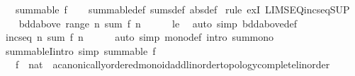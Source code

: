 \begin{isabellebody}
\ \ \ {\isachardoublequoteopen}summable\ f{\isachardoublequoteclose}\isanewline
%
\isadelimproof
\ \ %
\endisadelimproof
%
\isatagproof
{}\isamarkupfalse%
\ summable{\isacharunderscore}{\kern0pt}def\ sums{\isacharunderscore}{\kern0pt}def\ {\isacharbrackleft}{\kern0pt}abs{\isacharunderscore}{\kern0pt}def{\isacharbrackright}{\kern0pt}\isanewline
{}\isamarkupfalse%
\ {\isacharparenleft}{\kern0pt}rule\ exI\ LIMSEQ{\isacharunderscore}{\kern0pt}incseq{\isacharunderscore}{\kern0pt}SUP{\isacharparenright}{\kern0pt}{\isacharplus}{\kern0pt}\isanewline
\ \ \isamarkupfalse%
\ {\isachardoublequoteopen}bdd{\isacharunderscore}{\kern0pt}above\ {\isacharparenleft}{\kern0pt}range\ {\isacharparenleft}{\kern0pt}{\isasymlambda}n{\isachardot}{\kern0pt}\ sum\ f\ {\isacharbraceleft}{\kern0pt}{\isachardot}{\kern0pt}{\isachardot}{\kern0pt}{\isacharless}{\kern0pt}n{\isacharbraceright}{\kern0pt}{\isacharparenright}{\kern0pt}{\isacharparenright}{\kern0pt}{\isachardoublequoteclose}\isanewline
\ \ \ \ \isamarkupfalse%
\ le\ \isamarkupfalse%
\ {\isacharparenleft}{\kern0pt}auto\ simp{\isacharcolon}{\kern0pt}\ bdd{\isacharunderscore}{\kern0pt}above{\isacharunderscore}{\kern0pt}def{\isacharparenright}{\kern0pt}\isanewline
\ \ \isamarkupfalse%
\ {\isachardoublequoteopen}incseq\ {\isacharparenleft}{\kern0pt}{\isasymlambda}n{\isachardot}{\kern0pt}\ sum\ f\ {\isacharbraceleft}{\kern0pt}{\isachardot}{\kern0pt}{\isachardot}{\kern0pt}{\isacharless}{\kern0pt}n{\isacharbraceright}{\kern0pt}{\isacharparenright}{\kern0pt}{\isachardoublequoteclose}\isanewline
\ \ \ \ \isamarkupfalse%
\ {\isacharparenleft}{\kern0pt}auto\ simp{\isacharcolon}{\kern0pt}\ mono{\isacharunderscore}{\kern0pt}def\ intro{\isacharbang}{\kern0pt}{\isacharcolon}{\kern0pt}\ sum{\isacharunderscore}{\kern0pt}mono{}{\isacharparenright}{\kern0pt}\isanewline
{}\isamarkupfalse%
%
\endisatagproof
{\isafoldproof}%
%
\isadelimproof
\isanewline
%
\endisadelimproof
\isanewline
{}\isamarkupfalse%
\ summableI{\isacharbrackleft}{\kern0pt}intro{\isacharcomma}{\kern0pt}\ simp{\isacharbrackright}{\kern0pt}{\isacharcolon}{\kern0pt}\ {\isachardoublequoteopen}summable\ f{\isachardoublequoteclose}\isanewline
\ \ \ f\ {\isacharcolon}{\kern0pt}{\isacharcolon}{\kern0pt}\ {\isachardoublequoteopen}nat\ {\isasymRightarrow}\ {\isacharprime}{\kern0pt}a{\isacharcolon}{\kern0pt}{\isacharcolon}{\kern0pt}{\isacharbraceleft}{\kern0pt}canonically{\isacharunderscore}{\kern0pt}ordered{\isacharunderscore}{\kern0pt}monoid{\isacharunderscore}{\kern0pt}add{\isacharcomma}{\kern0pt}linorder{\isacharunderscore}{\kern0pt}topology{\isacharcomma}{\kern0pt}complete{\isacharunderscore}{\kern0pt}linorder{\isacharbraceright}{\kern0pt}{\isachardoublequoteclose}\isanewline

\end{isabellebody}
